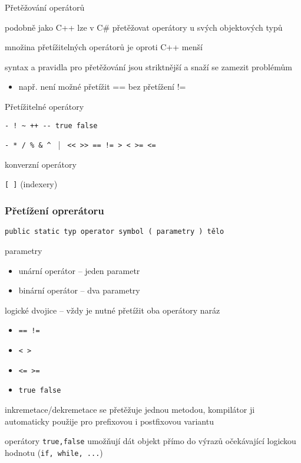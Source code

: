 
\begin{frame}[fragile]
\vfill
\begin{bitemize}{Přetěžování operátorů}
\item podobně jako C++ lze v C\# přetěžovat operátory u svých objektových typů
\item množina přetížitelných operátorů je oproti C++ menší
\item syntax a pravidla pro přetěžování jsou striktnější a snaží se zamezit problémům
\begin{itemize}
\item např. není možné přetížit == bez přetížení !=
\end{itemize}

\end{bitemize}
\vfill
\begin{bitemize}{Přetížitelné operátory}
\item \lstinline|- ! ~ ++ -- true false|
\item \lstinline|- * / % & ^ | | \lstinline| << >> == != > < >= <=|
\item konverzní operátory
\item \lstinline|[ ]| (indexery)
\end{bitemize}
\vfill
\end{frame}


\nezkouskove

\begin{frame}[fragile]
\frametitle{Přetížení oprerátoru}
\vfill
\begin{noteblock}{}
\begin{lstlisting}
public static typ operator symbol ( parametry ) tělo
\end{lstlisting}
\end{noteblock}
\vfill
\begin{bitemize}{}
\item parametry
\begin{itemize}
\item unární operátor -- jeden parametr
\item binární operátor -- dva parametry
\end{itemize}

\item logické dvojice -- vždy je nutné přetížit oba operátory naráz
\begin{itemize}
\item \lstinline|== !=|
\item \lstinline|< >|
\item \lstinline|<= >=|
\item \lstinline|true false|
\end{itemize}

\item inkremetace/dekremetace se přetěžuje jednou metodou, kompilátor ji automaticky použije pro prefixovou i postfixovou variantu
\item operátory \lstinline|true,false| umožňují dát objekt přímo do výrazů očekávající logickou hodnotu (\lstinline|if, while, ...|)

\end{bitemize}
\vfill
\end{frame}


